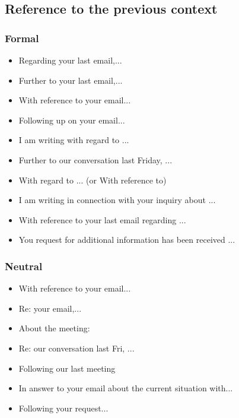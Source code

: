 \subsection{Reference to the previous context}

\subsubsection{Formal}
\begin{itemize}
\item Regarding your last email,...
\item Further to your last email,...
\item With reference to your email...
\item Following up on your email...
\item I am writing with regard to ...
\item Further to our conversation last Friday, ...
\item With regard to ... (or With reference to)
\item I am writing in connection with your inquiry about ...
\item With reference to your last email regarding ...
\item You request for additional information has been received ...
\end{itemize}

\subsubsection{Neutral}
\begin{itemize}
\item With reference to your email...
\item Re: your email,...
\item About the meeting:
\item Re: our conversation last Fri, ...
\item Following our last meeting
\item In answer to your email about the current situation with...
\item Following your request...
\end{itemize}